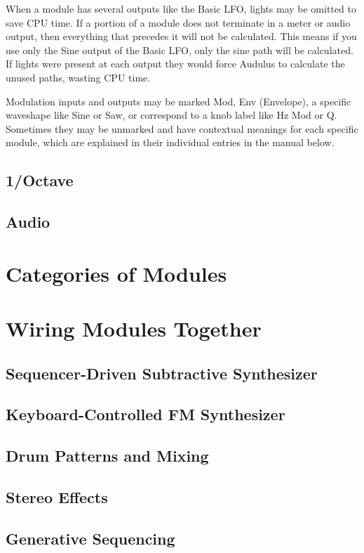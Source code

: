 \documentclass[11pt]{book}
\begin{document}
When a module has several outputs like the Basic LFO, lights may be omitted to save CPU time. If a portion of a module does not terminate in a meter or audio output, then everything that precedes it will not be calculated. This means if you use only the Sine output of the Basic LFO, only the sine path will be calculated. If lights were present at each output they would force Audulus to calculate the unused paths, wasting CPU time.

Modulation inputs and outputs may be marked Mod, Env (Envelope), a specific waveshape like Sine or Saw, or correspond to a knob label like Hz Mod or Q. Sometimes they may be unmarked and have contextual meanings for each specific module, which are explained in their individual entries in the manual below.

\subsection{1/Octave}
\subsection{Audio}

\section{Categories of Modules}

\section{Wiring Modules Together}
\subsection{Sequencer-Driven Subtractive Synthesizer}
\subsection{Keyboard-Controlled FM Synthesizer}
\subsection{Drum Patterns and Mixing}
\subsection{Stereo Effects}
\subsection{Generative Sequencing}
\end{document}
